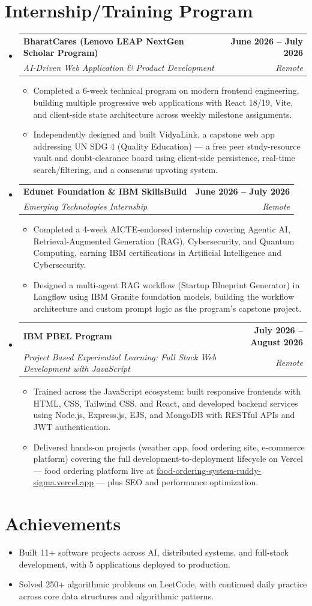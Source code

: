\documentclass[letterpaper,10pt]{article}
\makeatletter
\newcommand{\resumeItem}[1]{
  \item\small{
    {#1 \vspace{-2pt}}
  }
}
\newcommand{\resumeSubheading}[4]{
  \vspace{-2pt}\item
    \begin{tabular*}{1.0\textwidth}[t]{l@{\extracolsep{\fill}}r}
      \textbf{#1} & \textbf{\small #2} \\
      \textit{\small#3} & \textit{\small #4} \\
    \end{tabular*}\vspace{-7pt}
}
\newcommand{\resumeSubHeadingListStart}{\begin{itemize}[leftmargin=0.0in, label={}]}
\newcommand{\resumeSubHeadingListEnd}{\end{itemize}}
\newcommand{\resumeItemListStart}{\begin{itemize}}
\newcommand{\resumeItemListEnd}{\end{itemize}\vspace{-5pt}}
\makeatother
\begin{document}
\section{Internship/Training Program}
  \resumeSubHeadingListStart
    \resumeSubheading
      {BharatCares (Lenovo LEAP NextGen Scholar Program)}{June 2026 -- July 2026}
      {AI-Driven Web Application \& Product Development}{Remote}
      \resumeItemListStart
        \resumeItem{Completed a 6-week technical program on modern frontend engineering, building multiple progressive web applications with React 18/19, Vite, and client-side state architecture across weekly milestone assignments.}
        \resumeItem{Independently designed and built VidyaLink, a capstone web app addressing UN SDG 4 (Quality Education) — a free peer study-resource vault and doubt-clearance board using client-side persistence, real-time search/filtering, and a consensus upvoting system.}
      \resumeItemListEnd
    \resumeSubheading
      {Edunet Foundation \& IBM SkillsBuild}{June 2026 -- July 2026}
      {Emerging Technologies Internship}{Remote}
      \resumeItemListStart
        \resumeItem{Completed a 4-week AICTE-endorsed internship covering Agentic AI, Retrieval-Augmented Generation (RAG), Cybersecurity, and Quantum Computing, earning IBM certifications in Artificial Intelligence and Cybersecurity.}
        \resumeItem{Designed a multi-agent RAG workflow (Startup Blueprint Generator) in Langflow using IBM Granite foundation models, building the workflow architecture and custom prompt logic as the program's capstone project.}
      \resumeItemListEnd
    \resumeSubheading
      {IBM PBEL Program}{July 2026 -- August 2026}
      {Project Based Experiential Learning: Full Stack Web Development with JavaScript}{Remote}
      \resumeItemListStart
        \resumeItem{Trained across the JavaScript ecosystem: built responsive frontends with HTML, CSS, Tailwind CSS, and React, and developed backend services using Node.js, Express.js, EJS, and MongoDB with RESTful APIs and JWT authentication.}
        \resumeItem{Delivered hands-on projects (weather app, food ordering site, e-commerce platform) covering the full development-to-deployment lifecycle on Vercel — food ordering platform live at \href{https://food-ordering-system-ruddy-sigma.vercel.app/}{\underline{food-ordering-system-ruddy-sigma.vercel.app}} — plus SEO and performance optimization.}
      \resumeItemListEnd
  \resumeSubHeadingListEnd
\vspace{-12pt}

\section{Achievements}
      \resumeItemListStart
\resumeItem{Built 11+ software projects across AI, distributed systems, and full-stack development, with 5 applications deployed to production.}
  \vspace{-16pt}
\resumeItem{Solved 250+ algorithmic problems on LeetCode, with continued daily practice across core data structures and algorithmic patterns.}
     \resumeItemListEnd
\end{document}

